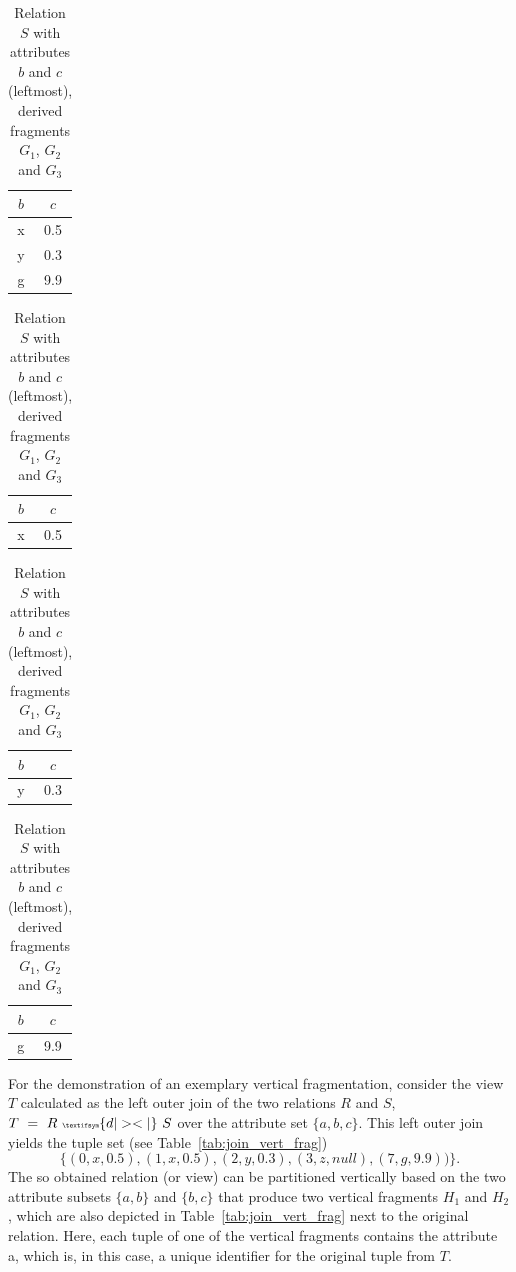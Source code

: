 \begin{exmp}
\begin{table}[h]
    \hspace*{\fill}
    \begin{center}
    \begin{tabular}{|c|c|}
        \hline
        $b$ & $c$\\
        \hline
        x & 0.5 \\
        y & 0.3 \\
        g & 9.9 \\
        \hline
    \end{tabular}
    \hspace{20pt}
    \begin{tabular}{|c|c|}
        \hline
        $b$ & $c$\\
        \hline
        x & 0.5 \\
        \hline
    \end{tabular}
    \hspace{5pt}
    \begin{tabular}{|c|c|}
        \hline
        $b$ & $c$\\
        \hline
        y & 0.3 \\
        \hline
    \end{tabular}
    \hspace{5pt}
    \begin{tabular}{|c|c|}
        \hline
        $b$ & $c$ \\
        \hline
        g & 9.9 \\
        \hline
    \end{tabular}
    \caption{Relation $S$ with attributes $b$ and $c$ (leftmost), derived fragments $G_1$, $G_2$ and $G_3$}
    \label{tab:s}
    \end{center}
\end{table}

For the demonstration of an exemplary vertical fragmentation, consider the view $T$ calculated as the left outer join of the two relations $R$ and $S$, 
$T~=~R~{\tiny \textifsym{d|><|}}~S$ over the attribute set $\{a,b,c\}$. 
This left outer join yields the tuple set (see Table~\ref{tab:join_vert_frag})
\[
\{(0,x,0.5), (1,x,0.5), (2,y,0.3), (3,z,null), (7,g,9.9))\}.
\]
The so obtained relation (or view) can be partitioned vertically based on the two attribute subsets $\{a,b\}$ and $\{b,c\}$ that produce two vertical
fragments $H_1$ and $H_2$, which are also depicted in Table~\ref{tab:join_vert_frag} next to the original relation. Here, each tuple of one of the 
vertical fragments contains the attribute a, which is, in this case, a unique identifier for the original tuple from $T$.


\end{exmp}
